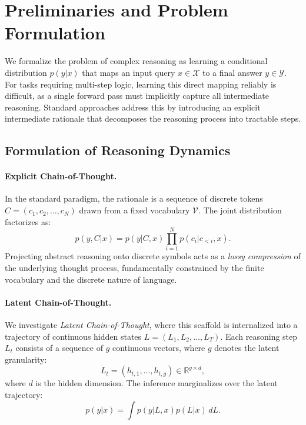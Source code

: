 
\section{Preliminaries and Problem Formulation}
\label{sec:preliminaries}
 

We formalize the problem of complex reasoning as learning a conditional distribution $p(y|x)$ that maps an input query $x \in \mathcal{X}$ to a final answer $y \in \mathcal{Y}$.
For tasks requiring multi-step logic, learning this direct mapping reliably is difficult, as a single forward pass must implicitly capture all intermediate reasoning. Standard approaches address this by introducing an explicit intermediate rationale that decomposes the reasoning process into tractable steps.

\subsection{Formulation of Reasoning Dynamics}
\label{subsec:formulation}

\paragraph{Explicit Chain-of-Thought.}
In the standard paradigm, the rationale is a sequence of discrete tokens $C = (c_1, c_2, \dots, c_N)$ drawn from a fixed vocabulary $\mathcal{V}$. The joint distribution factorizes as:
\begin{equation}
    p(y, C | x) = p(y | C, x) \prod_{i=1}^N p(c_i | c_{<i}, x).
\end{equation}
Projecting abstract reasoning onto discrete symbols acts as a \textit{lossy compression} of the underlying thought process, fundamentally constrained by the finite vocabulary and the discrete nature of language.%

\paragraph{Latent Chain-of-Thought.}
We investigate \textit{Latent Chain-of-Thought}, where this scaffold is internalized into a trajectory of continuous hidden states $L = (L_1, L_2, \dots, L_T)$.
Each reasoning step $L_t$ consists of a sequence of $g$ continuous vectors, where $g$ denotes the latent granularity:
\begin{equation}
    L_t = (h_{t,1}, \dots, h_{t,g}) \in \mathbb{R}^{g \times d},
\end{equation}
where $d$ is the hidden dimension. The inference marginalizes over the latent trajectory:
\begin{equation}
    p(y|x) = \int p(y|L, x) p(L|x)\,dL.
\end{equation} %



